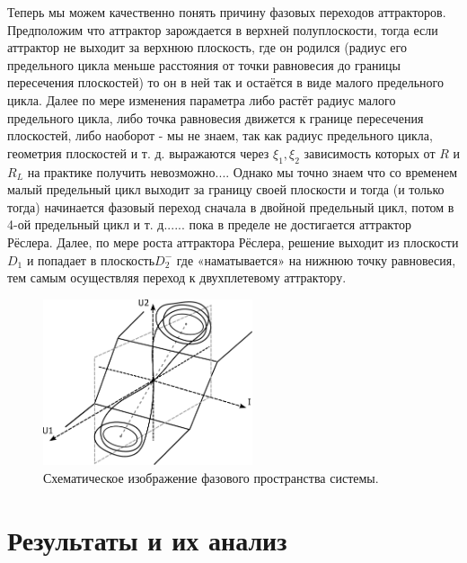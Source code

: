 \documentclass[12pt]{article}
\begin{document}
Теперь мы можем качественно понять причину фазовых переходов аттракторов. Предположим что аттрактор зарождается в верхней полуплоскости, тогда если аттрактор  не выходит за верхнюю плоскость, где он родился (радиус его предельного цикла меньше расстояния от точки равновесия до границы пересечения плоскостей) то он в ней так и остаётся в виде малого предельного цикла. Далее по мере изменения параметра либо растёт радиус малого предельного цикла, либо точка равновесия движется к границе пересечения плоскостей, либо наоборот - мы не знаем, так как радиус предельного цикла, геометрия плоскостей и т. д. выражаются через $\xi_1, \xi_2$ зависимость которых от $R$ и $R_L$ на практике получить невозможно.... Однако мы точно знаем что со временем малый предельный цикл выходит за границу своей плоскости и тогда (и только тогда) начинается фазовый переход сначала в двойной предельный цикл, потом в 4-ой предельный цикл и т. д...... пока в пределе не достигается аттрактор Рёслера. Далее, по мере роста аттрактора Рёслера, решение выходит из плоскости $D_1$ и попадает в плоскость$D_2^{-}$ где «наматывается» на нижнюю точку равновесия, тем самым осуществляя переход к двухплетевому аттрактору.
\begin{figure}[H]
	\centering
	\includegraphics[width=0.55\textwidth]{Kartinka.pdf}
	\caption{Схематическое изображение фазового пространства системы.}
	\label{fig:kartinka}
\end{figure}

\section*{Результаты и их анализ}
\end{document}

